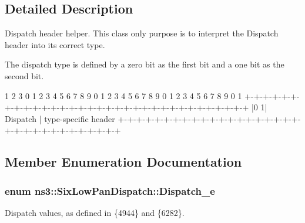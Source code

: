 \subsection{Detailed Description}
Dispatch header helper. This class only purpose is to interpret the Dispatch header into its correct type. 

The dispatch type is defined by a zero bit as the first bit and a one bit as the second bit. \begin{DoxyVerb}                      1                   2                   3
  0 1 2 3 4 5 6 7 8 9 0 1 2 3 4 5 6 7 8 9 0 1 2 3 4 5 6 7 8 9 0 1
 +-+-+-+-+-+-+-+-+-+-+-+-+-+-+-+-+-+-+-+-+-+-+-+-+-+-+-+-+-+-+-+-+
 |0 1| Dispatch  |  type-specific header
 +-+-+-+-+-+-+-+-+-+-+-+-+-+-+-+-+-+-+-+-+-+-+-+-+-+-+-+-+-+-+-+-+
\end{DoxyVerb}
 

\subsection{Member Enumeration Documentation}
\subsubsection[{\texorpdfstring{Dispatch\+\_\+e}{Dispatch_e}}]{\setlength{\rightskip}{0pt plus 5cm}enum {\bf ns3\+::\+Six\+Low\+Pan\+Dispatch\+::\+Dispatch\+\_\+e}}\hypertarget{classns3_1_1SixLowPanDispatch_aa51561db1ae4239db574d31d7aebbb5f}{}\label{classns3_1_1SixLowPanDispatch_aa51561db1ae4239db574d31d7aebbb5f}


Dispatch values, as defined in \{4944\} and \{6282\}. 

